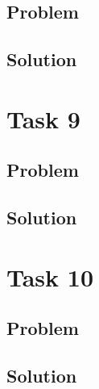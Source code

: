 \documentclass[a4paper, 10pt]{article}
\begin{document}
		\subsection{Problem}
		
		\subsection{Solution}
	
	\section{Task 9}
	
		\subsection{Problem}
		
		\subsection{Solution}
	
	\section{Task 10}
	
		\subsection{Problem}
		
		\subsection{Solution}
\end{document}
